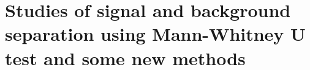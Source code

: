 \documentclass[final,1p,11pt]{elsarticle}
\begin{document}
\section{Studies of signal and background separation using Mann-Whitney U test and some new methods}




\end{document}
